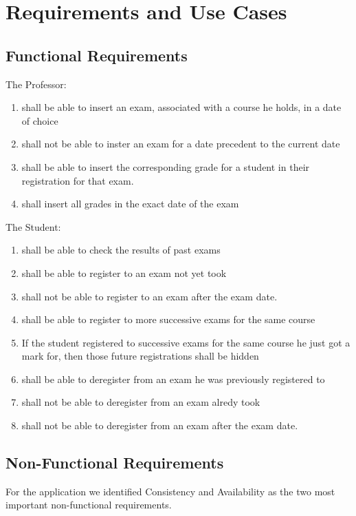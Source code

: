 \documentclass{report}
\begin{document}
\chapter*{Requirements and Use Cases}
\section*{Functional Requirements}
The Professor:
\begin{enumerate}
	\item shall be able to insert an exam, associated with a course he holds, in a date of choice
	\item shall not be able to inster an exam for a date precedent to the current date
	\item shall be able to insert the corresponding grade for a student in their registration for that exam.
	\item shall insert all grades in the exact date of the exam
\end{enumerate}
The Student:
\begin{enumerate}
	\item shall be able to check the results of past exams
	\item shall be able to register to an exam not yet took
	\item shall not be able to register to an exam after the exam date.
	\item shall be able to register to more successive exams for the same course
	\item If the student registered to successive exams for the same course he just got a mark for, then those future registrations shall be hidden
	\item shall be able to deregister from an exam he was previously registered to
	\item shall not be able to deregister from an exam alredy took
	\item shall not be able to deregister from an exam after the exam date.
\end{enumerate}
\section*{Non-Functional Requirements}
For the application we identified Consistency and Availability as the two most important non-functional requirements.
\newpage
{}
\end{document}
